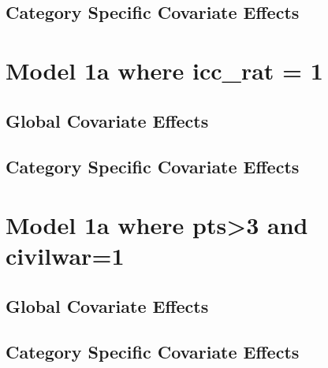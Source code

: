 \documentclass[]{article}
\begin{document}
\subsection{Category Specific Covariate Effects}

\clearpage

\section{Model 1a where icc_rat = 1}
\subsection{Global Covariate Effects}

\clearpage
\subsection{Category Specific Covariate Effects}

\clearpage


\section{Model 1a where pts>3 and civilwar=1}
\subsection{Global Covariate Effects}

\clearpage
\subsection{Category Specific Covariate Effects}

\clearpage
\end{document}
